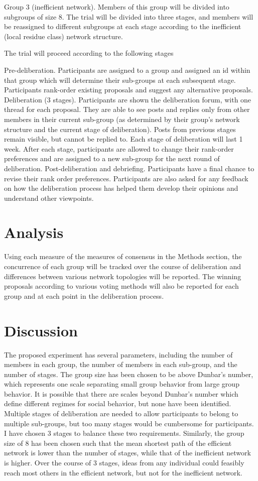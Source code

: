 Group 3 (inefficient network). Members of this group will be divided into subgroups of size 8. The trial will be divided into three stages, and members will be reassigned to different subgroups at each stage according to the inefficient (local residue class) network structure.

The trial will proceed according to the following stages

Pre-deliberation. Participants are assigned to a group and assigned an id within that group which will determine their sub-groups at each subsequent stage. Participants rank-order existing proposals and suggest any alternative proposals.
Deliberation (3 stages). Participants are shown the deliberation forum, with one thread for each proposal. They are able to see posts and replies only from other members in their current sub-group (as determined by their group’s network structure and the current stage of deliberation). Posts from previous stages remain visible, but cannot be replied to. Each stage of deliberation will last 1 week. After each stage, participants are allowed to change their rank-order preferences and are assigned to a new sub-group for the next round of deliberation.
Post-deliberation and debriefing. Participants have a final chance to revise their rank order preferences. Participants are also asked for any feedback on how the deliberation process has helped them develop their opinions and understand other viewpoints.

\section{Analysis}
Using each measure of the measures of consensus in the Methods section, the concurrence of each group will be tracked over the course of deliberation and differences between various network topologies will be reported. The winning proposals according to various voting methods will also be reported for each group and at each point in the deliberation process.

\section{Discussion}
The proposed experiment has several parameters, including the number of members in each group, the number of members in each sub-group, and the number of stages. The group size has been chosen to be above Dunbar’s number, which represents one scale separating small group behavior from large group behavior. It is possible that there are scales beyond Dunbar’s number which define different regimes for social behavior, but none have been identified. Multiple stages of deliberation are needed to allow participants to belong to multiple sub-groups, but too many stages would be cumbersome for participants. I have chosen 3 stages to balance these two requirements. Similarly, the group size of 8 has been chosen such that the mean shortest path of the efficient network is lower than the number of stages, while that of the inefficient network is higher. Over the course of 3 stages, ideas from any individual could feasibly reach most others in the efficient network, but not for the inefficient network.

